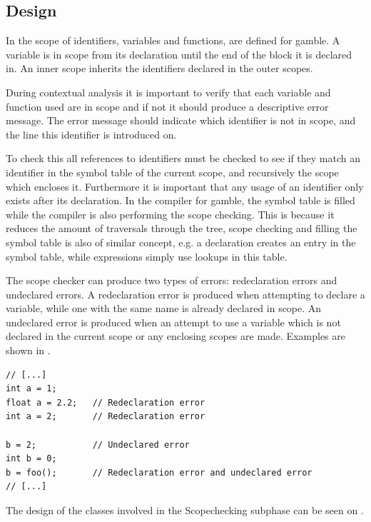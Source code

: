 \subsection*{Design}
In  the scope of identifiers, variables and functions, are defined for \gls{gamble}.
A variable is in scope from its declaration until the end of the block it is declared in.
An inner scope inherits the identifiers declared in the outer scopes. 

During contextual analysis it is important to verify that each variable and function used are in scope and if not it should produce a descriptive error message.
The error message should indicate which identifier is not in scope, and the line this identifier is introduced on.

To check this all references to identifiers must be checked to see if they match an identifier in the symbol table of the current scope, and recursively the scope which encloses it. 
Furthermore it is important that any usage of an identifier only exists after its declaration.
In the compiler for \gls{gamble}, the symbol table is filled while the compiler is also performing the scope checking.
This is because it reduces the amount of traversals through the tree, scope checking and filling the symbol table is also of similar concept, e.g. a declaration creates an entry in the symbol table, while expressions simply use lookups in this table.

The scope checker can produce two types of errors: redeclaration errors and undeclared errors.
A redeclaration error is produced when attempting to declare a variable, while one with the same name is already declared in scope.
An undeclared error is produced when an attempt to use a variable which is not declared in the current scope or any enclosing scopes are made. 
Examples are shown in .

\begin{lstlisting}[caption=Examples of scope errors in \gls{gamble}, numbers=none,frame=tlrb,label={lst:scopeErrors}]
// [...]
int a = 1;
float a = 2.2;   // Redeclaration error
int a = 2;       // Redeclaration error 

b = 2;           // Undeclared error   
int b = 0;
b = foo();       // Redeclaration error and undeclared error 
// [...]
\end{lstlisting}

The design of the classes involved in the Scopechecking subphase can be seen on .

